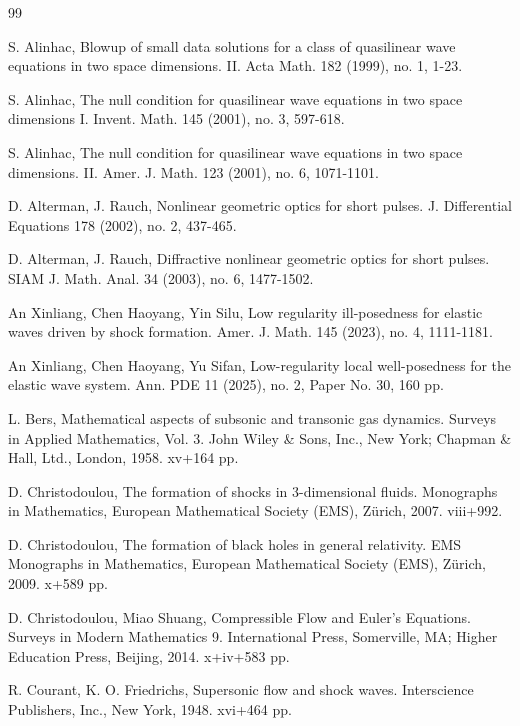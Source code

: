 \documentclass[11pt,twoside]{article}
\begin{document}
\begin{thebibliography}{99}
	
 S. Alinhac, Blowup of small data solutions for a class of quasilinear wave equations in two space dimensions. II.
 Acta Math. 182 (1999), no. 1, 1-23.

 S. Alinhac, The null condition for quasilinear wave equations in two space dimensions I.
Invent. Math. 145 (2001), no. 3, 597-618.
	
	
 S. Alinhac, The null condition for quasilinear wave equations in two space dimensions. II.
 Amer. J. Math. 123 (2001), no. 6, 1071-1101.
	


 D. Alterman, J. Rauch, Nonlinear geometric optics for short pulses.
 J. Differential Equations 178  (2002), no. 2, 437-465.


 D. Alterman, J. Rauch, Diffractive nonlinear geometric optics for short pulses.
SIAM J. Math. Anal. 34  (2003), no. 6, 1477-1502.

An Xinliang, Chen Haoyang, Yin Silu, Low regularity ill-posedness for elastic waves driven by shock formation.
Amer. J. Math. 145 (2023), no. 4, 1111-1181.

An Xinliang, Chen Haoyang, Yu Sifan, Low-regularity local well-posedness for the elastic wave system.
Ann. PDE 11 (2025), no. 2, Paper No. 30, 160 pp.


	
 L. Bers, Mathematical aspects of subsonic and transonic gas dynamics. Surveys in Applied Mathematics, Vol. 3.
John Wiley \& Sons, Inc., New York; Chapman \& Hall, Ltd., London, 1958. xv+164 pp.
	
	
 D. Christodoulou, The formation of shocks in 3-dimensional fluids. Monographs in Mathematics,
European Mathematical Society (EMS), Z\"urich, 2007. viii+992.

	
 D. Christodoulou, The formation of black holes in general relativity. EMS Monographs in Mathematics,
European Mathematical Society (EMS), Z\"urich, 2009. x+589 pp.




 D. Christodoulou, Miao Shuang, Compressible Flow and Euler's Equations. Surveys in Modern Mathematics 9.
International Press, Somerville, MA; Higher Education Press, Beijing, 2014. x+iv+583 pp.
	
	
 R. Courant, K. O. Friedrichs, Supersonic flow and shock waves. Interscience Publishers, Inc., New York,
1948. xvi+464 pp.


\end{thebibliography}
\end{document}
